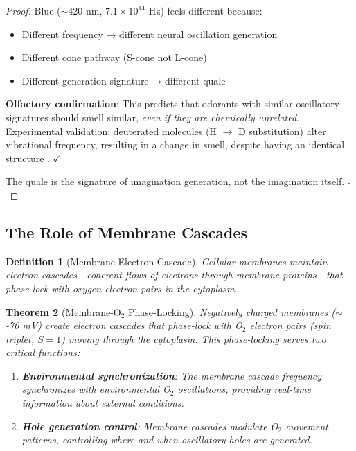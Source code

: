 \documentclass[11pt,a4paper]{article}
\newtheorem{theorem}{Theorem}
\newtheorem{definition}[theorem]{Definition}
\begin{document}
\begin{proof}
Blue ($\sim$420 nm, $7.1 \times 10^{14}$ Hz) feels different because:
\begin{itemize}
\item Different frequency → different neural oscillation generation
\item Different cone pathway (S-cone not L-cone)
\item Different generation signature → different quale
\end{itemize}

\textbf{Olfactory confirmation}: This predicts that odorants with similar oscillatory signatures should smell similar, \textit{even if they are chemically unrelated}. Experimental validation: deuterated molecules (H $\to$ D substitution) alter vibrational frequency, resulting in a change in smell, despite having an identical structure \cite{franco2011deuterium}. $\checkmark$

The quale is the signature of imagination generation, not the imagination itself. $\square$
\end{proof}

\subsection{The Role of Membrane Cascades}

\begin{definition}[Membrane Electron Cascade]
Cellular membranes maintain electron cascades—coherent flows of electrons through membrane proteins—that phase-lock with oxygen electron pairs in the cytoplasm.
\end{definition}

\begin{theorem}[Membrane-O$_2$ Phase-Locking]
\label{thm:membrane_phase_lock}
Negatively charged membranes ($\sim$-70 mV) create electron cascades that phase-lock with O$_2$ electron pairs (spin triplet, $S=1$) moving through the cytoplasm. This phase-locking serves two critical functions:
\begin{enumerate}
\item \textbf{Environmental synchronization}: The membrane cascade frequency synchronizes with environmental O$_2$ oscillations, providing real-time information about external conditions.
\item \textbf{Hole generation control}: Membrane cascades modulate O$_2$ movement patterns, controlling where and when oscillatory holes are generated.
\end{enumerate}
\end{theorem}
\end{document}
